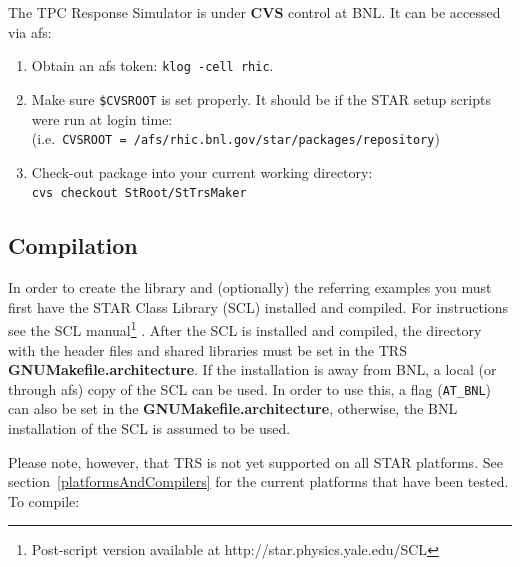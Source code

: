 \documentclass[twoside]{article}
\newcommand{\name}[1]{\textsf{#1}}%
\newcommand{\comp}[1]{\texttt{#1}}%
\begin{document}
The \name{TPC Response Simulator} is under {\bf CVS} control at BNL.  It can
be accessed via \name{afs}:   
\begin{enumerate}
  \item Obtain an \name{afs} token: \comp{klog -cell rhic}.
  \item Make sure \comp{\$CVSROOT} is set properly.  It should be
    if the STAR setup scripts were run at login time:\\
    (i.e.~\comp{CVSROOT = /afs/rhic.bnl.gov/star/packages/repository})
  \item Check-out package into your current working directory:\\
    \comp{cvs checkout StRoot/StTrsMaker}
\end{enumerate}

\subsection{Compilation}   \label{compile}

In order to create the library and (optionally) the referring examples
you must first have the STAR Class Library (\name{SCL})  installed
and compiled.  For instructions see the \name{SCL} manual\footnote{Post-script
  version available at http://star.physics.yale.edu/SCL}
.  After the \name{SCL} is installed and compiled,
the directory with the  header files and shared libraries must
be set in the \name{TRS} {\bf GNUMakefile.architecture}.  If the
installation is away from BNL, a local (or through \name{afs})
copy of the \name{SCL} can be used.  In order to use this, a flag
(\texttt{AT\_BNL}) can also be set in the {\bf GNUMakefile.architecture},
otherwise, the BNL installation of the \name{SCL} is assumed to be used.

Please note, however, that \name{TRS} is not yet supported
on all STAR platforms.
See section~\ref{platformsAndCompilers} for the current platforms that have
been tested.  To compile:
\end{document}
